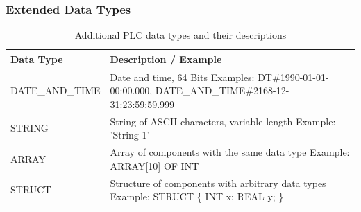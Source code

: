 \begin{frame}
	\frametitle{Extended Data Types}
	\centering
	\footnotesize
	\begin{table}
		\setlength{\tabcolsep}{4pt}
		\centering
		\setlength{\tabcolsep}{4pt}
		\begin{tabular}{@{}>{\raggedright\arraybackslash}p{4cm}
						>{\raggedright\arraybackslash}p{7cm}@{}}
			\toprule
			\textbf{Data Type} & \textbf{Description / Example} \\
			\midrule
			DATE\_AND\_TIME & Date and time, 64 Bits \newline Examples: DT\#1990-01-01-00:00.000, DATE\_AND\_TIME\#2168-12-31:23:59:59.999 \\
			STRING          & String of ASCII characters, variable length \newline Example: 'String 1' \\
			ARRAY           & Array of components with the same data type \newline Example: ARRAY[10] OF INT \\
			STRUCT          & Structure of components with arbitrary data types \newline Example: STRUCT \{ INT x; REAL y; \} \\
			\bottomrule
		\end{tabular}
		\caption{Additional PLC data types and their descriptions}
		\label{tab:plc_data_types_extended}
	\end{table}
\end{frame}

